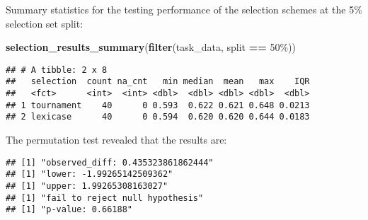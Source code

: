 \documentclass[
]{book}
\newenvironment{Shaded}{\begin{snugshade}}{\end{snugshade}}
\newcommand{\AttributeTok}[1]{\textcolor[rgb]{0.13,0.29,0.53}{#1}}
\newcommand{\DecValTok}[1]{\textcolor[rgb]{0.00,0.00,0.81}{#1}}
\newcommand{\FunctionTok}[1]{\textcolor[rgb]{0.13,0.29,0.53}{\textbf{#1}}}
\newcommand{\NormalTok}[1]{#1}
\newcommand{\OtherTok}[1]{\textcolor[rgb]{0.56,0.35,0.01}{#1}}
\newcommand{\SpecialCharTok}[1]{\textcolor[rgb]{0.81,0.36,0.00}{\textbf{#1}}}
\newcommand{\StringTok}[1]{\textcolor[rgb]{0.31,0.60,0.02}{#1}}
\begin{document}
Summary statistics for the testing performance of the selection schemes at the 5\% selection set split:

\begin{Shaded}
\begin{Highlighting}[]
\FunctionTok{selection\_results\_summary}\NormalTok{(}\FunctionTok{filter}\NormalTok{(task\_data, split }\SpecialCharTok{==} \StringTok{\textquotesingle{}50\%\textquotesingle{}}\NormalTok{))}
\end{Highlighting}
\end{Shaded}

\begin{verbatim}
## # A tibble: 2 x 8
##   selection  count na_cnt   min median  mean   max    IQR
##   <fct>      <int>  <int> <dbl>  <dbl> <dbl> <dbl>  <dbl>
## 1 tournament    40      0 0.593  0.622 0.621 0.648 0.0213
## 2 lexicase      40      0 0.594  0.620 0.620 0.644 0.0183
\end{verbatim}

The permutation test revealed that the results are:

\begin{Shaded}
\end{Shaded}

\begin{verbatim}
## [1] "observed_diff: 0.435323861862444"
## [1] "lower: -1.99265142509362"
## [1] "upper: 1.99265308163027"
## [1] "fail to reject null hypothesis"
## [1] "p-value: 0.66188"
\end{verbatim}
\end{document}
